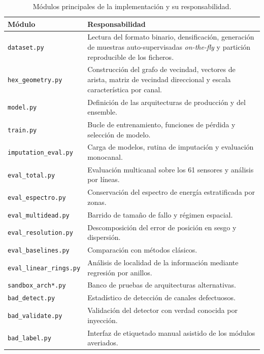 \begin{table}[htbp]
\centering
\caption{Módulos principales de la implementación y su responsabilidad.}
\label{tab:modulos-codigo}
\small
\begin{tabular}{p{}p{}}
\toprule
\textbf{Módulo} & \textbf{Responsabilidad} \\
\midrule
\texttt{dataset.py} & Lectura del formato binario, densificación, generación de muestras
    auto-supervisadas \emph{on-the-fly} y partición reproducible de los ficheros. \\
\texttt{hex\_geometry.py} & Construcción del grafo de vecindad, vectores de arista, matriz de
    vecindad direccional y escala característica por canal. \\
\texttt{model.py} & Definición de las arquitecturas de producción y del ensemble. \\
\texttt{train.py} & Bucle de entrenamiento, funciones de pérdida y selección de modelo. \\
\texttt{imputation\_eval.py} & Carga de modelos, rutina de imputación y evaluación monocanal. \\
\texttt{eval\_total.py} & Evaluación multicanal sobre los 61 sensores y análisis por líneas. \\
\texttt{eval\_espectro.py} & Conservación del espectro de energía estratificada por zonas. \\
\texttt{eval\_multidead.py} & Barrido de tamaño de fallo y régimen espacial. \\
\texttt{eval\_resolution.py} & Descomposición del error de posición en sesgo y dispersión. \\
\texttt{eval\_baselines.py} & Comparación con métodos clásicos. \\
\texttt{eval\_linear\_rings.py} & Análisis de localidad de la información mediante regresión por anillos. \\
\texttt{sandbox\_arch*.py} & Banco de pruebas de arquitecturas alternativas. \\
\texttt{bad\_detect.py} & Estadístico de detección de canales defectuosos. \\
\texttt{bad\_validate.py} & Validación del detector con verdad conocida por inyección. \\
\texttt{bad\_label.py} & Interfaz de etiquetado manual asistido de los módulos averiados. \\
\bottomrule
\end{tabular}
\end{table}



